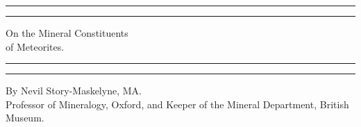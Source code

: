 \documentclass[a4paper, 12pt, oneside]{article}
\begin{document}
\begin{titlepage} %
	\centering %
	\scshape %

	
	\rule{\textwidth}{1.6pt}\vspace*{-\baselineskip}\vspace*{2pt} %
	\rule{\textwidth}{0.4pt} %
	
	\vspace{0.75\baselineskip} %

    {\LARGE On the Mineral Constituents\\ of Meteorites.} %
	
	\vspace{0.75\baselineskip} %
	
	\rule{\textwidth}{0.4pt}\vspace*{-\baselineskip}\vspace{3.2pt} %
	\rule{\textwidth}{1.6pt} %
	
	\vspace{1\baselineskip} %
	
	
	{By Nevil Story-Maskelyne, MA.\\ \small Professor of Mineralogy, Oxford, and Keeper of the Mineral Department, British Museum.} %
	
	\vspace*{1\baselineskip} %
	
	
	\vspace{1\baselineskip} %

	
	
		

\end{titlepage}
\end{document}
